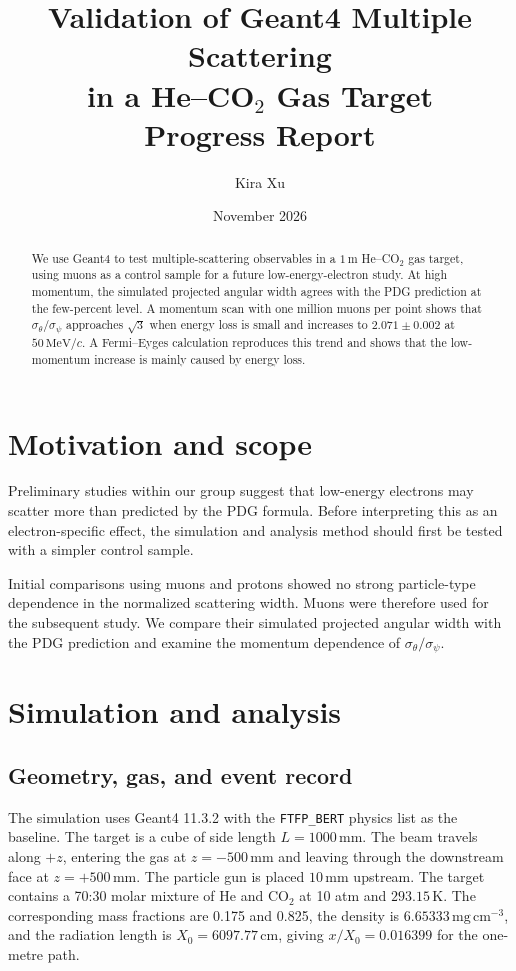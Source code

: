 \documentclass[10pt,letterpaper]{article}
\title{
Validation of Geant4 Multiple Scattering\\
in a He--CO$_2$ Gas Target\\[0.6em]
{\large\textnormal{Progress Report}}
}
\author[1]{Kira Xu}
\affil[1]{Department of Physics and Astronomy, University of Hawai\kern0.05em`i at M\=anoa}
\date{November 2026}
\newcommand{\mm}{\,\mathrm{mm}}
\newcommand{\cm}{\,\mathrm{cm}}
\begin{document}
\maketitle

\begin{abstract}
We use Geant4 to test multiple-scattering observables in a $1\,\mathrm{m}$
He--CO$_2$ gas target, using muons as a control sample for a future
low-energy-electron study. At high momentum, the simulated projected angular
width agrees with the PDG prediction at the few-percent level. A momentum scan with one
million muons per point shows that $\sigma_\theta/\sigma_\psi$ approaches
$\sqrt{3}$ when energy loss is small and increases to
$2.071\pm0.002$ at $50\,\mathrm{MeV}/c$. A Fermi--Eyges calculation reproduces
this trend and shows that the low-momentum increase is mainly caused by energy
loss.
\end{abstract}

\section{Motivation and scope}

Preliminary studies within our group suggest that low-energy electrons may
scatter more than predicted by the PDG formula. Before interpreting this as an
electron-specific effect, the simulation and analysis method should first be
tested with a simpler control sample.

Initial comparisons using muons and protons showed no strong particle-type
dependence in the normalized scattering width. Muons were therefore used for
the subsequent study. We compare their simulated projected angular width with
the PDG prediction and examine the momentum dependence of
$\sigma_\theta/\sigma_\psi$.

\section{Simulation and analysis}
\subsection{Geometry, gas, and event record}

The simulation uses Geant4 11.3.2 with the \texttt{FTFP\_BERT} physics list as
the baseline. The target is a cube of side length $L=1000\mm$. The beam travels
along $+z$, entering the gas at $z=-500\mm$ and leaving through the downstream
face at $z=+500\mm$. The particle gun is placed $10\mm$ upstream. The target
contains a 70:30 molar mixture of He and CO$_2$ at 10 atm and $293.15\,\mathrm{K}$.
The corresponding mass fractions are 0.175 and 0.825, the density is
$6.65333\,\mathrm{mg\,cm^{-3}}$, and the radiation length is $X_0=6097.77\cm$,
giving $x/X_0=0.016399$ for the one-metre path.
\end{document}
